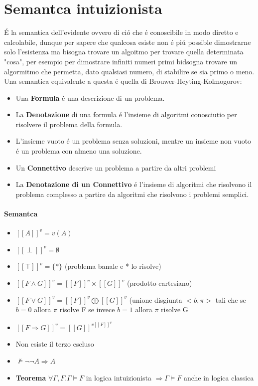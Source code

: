 \documentclass{article}
\begin{document}
\section{Semantca intuizionista}
É la semantica dell'evidente ovvero di ció che é conoscibile in modo diretto e calcolabile, dunque per sapere che qualcosa esiste non é piú possible dimostrarne solo l'esistenza ma bisogna trovare un algoitmo per trovare quella determinata "cosa", per esempio per dimostrare infiniti numeri primi bidsogna trovare un algormitmo che permetta, dato qualsiasi numero, di stabilire se sia primo o meno. Una semantica equivalente a questa é quella di Brouwer-Heyting-Kolmogorov:
\begin{itemize}
    \item Una \textbf{Formula} é una descrizione di un problema.
    \item La \textbf{Denotazione} di una formula é l'insieme di algoritmi conosciutio per risolvere il problema della formula.
    \item L'insieme vuoto é un problema senza soluzioni, mentre un insieme non vuoto é un problema con almeno una soluzione.
    \item Un \textbf{Connettivo} descrive un problema a partire da altri problemi
    \item La \textbf{Denotazione di un Connettivo} é l'insieme di algoritmi che risolvono il problema complesso a partire da algoritmi che risolvono i problemi semplici.
\end{itemize}

\paragraph{Semantca}
\begin{itemize}
    \item $[[A]]^v = v(A)$
    \item $[[\perp]]^v = \emptyset$
    \item $[[\top]]^v=\{*\}$ (problema banale e * lo risolve)
    \item $[[F \land G]]^v = [[F]]^v \times[[G]]^v$ (prodotto cartesiano)
    \item $[[F \lor G]]^v = [[F]]^v \bigoplus[[G]]^v$ (unione disgiunta $<b,\pi>$ tali che se$ b = 0$ allora $\pi$ risolve F se invece $b=1$ allora $\pi$ risolve G
    \item $[[F \Rightarrow G]]^v = [[G]]^{v[[F]]^v}$
    \item Non esiste il terzo escluso
    \item $\not\vDash \neg\neg A \Rightarrow A$
    \item \textbf{Teorema} $\forall\Gamma, F. \Gamma \vDash F$ in logica intuizionista $\Rightarrow \Gamma\vDash F$ anche in logica classica
\end{itemize}
\end{document}
